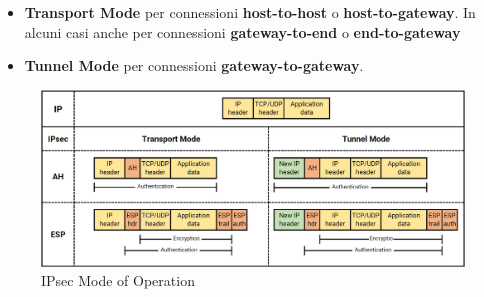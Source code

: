 \begin{theorem}\label{def:ipsecmodesel}
\begin{itemize}
    \item \textbf{Transport Mode} per connessioni \textbf{host-to-host} o \textbf{host-to-gateway}. In alcuni casi anche per connessioni \textbf{gateway-to-end} o \textbf{end-to-gateway}
    \item \textbf{Tunnel Mode} per connessioni \textbf{gateway-to-gateway}.
\end{itemize}
\end{theorem}
\begin{figure}[h]
    \centering
    \includegraphics[width=\linewidth]{image/ipsecmode.png}
    \caption{IPsec Mode of Operation}
    \label{fig:my_label}
\end{figure}
